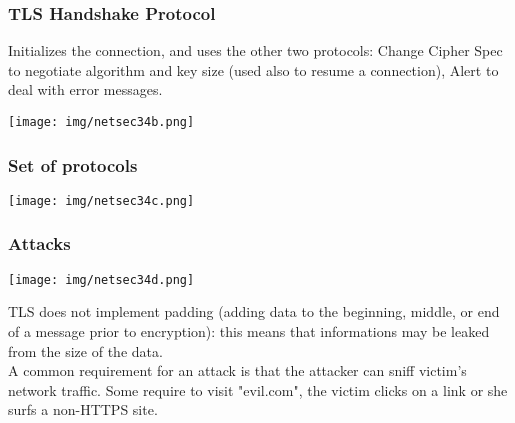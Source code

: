 \documentclass[a4paper, 10pt, titlepage]{article}
\begin{document}
\subsubsection*{TLS Handshake Protocol}
Initializes the connection, and uses the other two protocols: Change Cipher Spec to negotiate algorithm and key size (used also to resume a connection), Alert to deal with error messages.
\begin{center}
	\texttt{[image: img/netsec34b.png]}
\end{center}

\subsubsection*{Set of protocols}
\begin{center}
	\texttt{[image: img/netsec34c.png]}
\end{center}

\subsubsection*{Attacks}
\begin{center}
	\texttt{[image: img/netsec34d.png]}
\end{center}
TLS does not implement padding (adding data to the beginning, middle, or end of a message prior to encryption): this means that informations may be leaked from the size of the data. \medskip\\
A common requirement for an attack is that the attacker can sniff victim’s network traffic. Some require to visit "evil.com", the victim clicks on a link or she surfs a non-HTTPS site.
\end{document}
